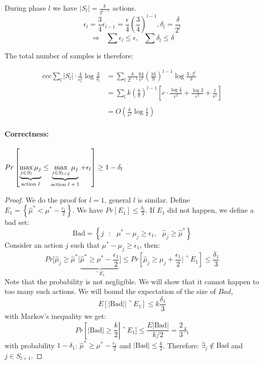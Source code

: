 During phase $l$ we have $\left|S_{l}\right|=\frac{k}{2^{l-1}}$
actions.
\[
\epsilon_{l}=\frac{3}{4}\epsilon_{l-1}=\frac{\epsilon}{4}\left(\frac{3}{4}\right)^{l-1},\text{
}\delta_{l}=\frac{\delta}{2^{l}}
\]
\[
\Rightarrow\text{ }{\displaystyle \sum\epsilon_{l}\le\epsilon},\text{ }{\displaystyle \sum\delta_{l}\le\delta}
\]

The total number of samples is therefore:

\begin{align*}{ccc}
 \sum_l |S_l| \cdot \frac{4}{\epsilon_l^2}\log \frac{3}{\delta_l} &=
\sum_{l}\frac{k}{2^{l-1}}\frac{64}{\epsilon^{2}}\left(\frac{16}{9}\right)^{l-1}\log\frac{3\cdot2^{l}}{\delta}\\
& =  {\displaystyle \sum_{l}k\left(\frac{8}{9}\right)^{l-1}\left[c\cdot\frac{\log\frac{1}{\delta}}{\epsilon^{2}}+\frac{\log3}{\epsilon^{2}}+\frac{l}{\epsilon^{2}}\right]}\\
\\
 & =  O\left(\frac{k}{\epsilon^{2}}\log\frac{1}{\delta}\right)
\end{align*}


\paragraph{Correctness:}

\begin{theorem}
$Pr\left[\underbrace{{\displaystyle \max_{j\in
S_{l}}\mu_{j}}}_{\text{action
\ensuremath{l}}}\le\underbrace{{\displaystyle \max_{j\in
S_{l+2}}\mu_{j}}}_{\text{action
\ensuremath{l+1}}}+\epsilon_{l}\right]\ge1-\delta_{l}$
\end{theorem}

\begin{proof}
We do the proof for $l=1$, general $l$ is similar. Define
$E_{1}=\left\{\hat{\mu}^{*}<\mu^{*}-\frac{\epsilon_{1}}{2}\right\}$.
We have  $Pr\left[E_{1}\right]\le\frac{\delta_{1}}{3}$. If $E_{1}$
did not happen, we define a bad set:
\[
\text{Bad}=\left\{ j\text{ }:\text{ }\mu^{*}-\mu_{j}\ge\epsilon_{1},\text{ }\hat{\mu}_{j}\ge\hat{\mu}^{*}\right\}
\]
Consider an action $j$ such that $\mu^*-\mu_j\geq \epsilon_1$, then:
\[
Pr[\hat{\mu}_{j}\geq
\hat{\mu}^{*}|\underbrace{\hat{\mu}^{*}\ge\mu^{*}-\frac{\epsilon_{1}}{2}}_{\urcorner
E_{1}}\big] \le
Pr[\hat{\mu}_{j}\ge\mu_{j}+\frac{\epsilon_{1}}{2}|\urcorner E_{1}]
\le  \frac{\delta_{1}}{3}
\]
Note that the probability is not negligible. We will show that it
cannot happen to too many such actions. We will bound the
expectation of the size of $Bad$,
\[
E[|\text{Bad}||\urcorner E_{1}]\le k\frac{\delta_{1}}{3}
\]
 with Markov's inequality we get:
\[
Pr\left[\left|\text{Bad}\right|\ge\frac{k}{2}\right|\urcorner E_{1}]
 \le  \frac{E\left|\text{Bad}\right|}{k/2}
  =  \frac{2}{3}\delta_{1}
\]
 with probability $1-\delta_{1}$: $\hat{\mu}^{*}\ge\mu^{*}-\frac{\epsilon_{1}}{2}$
and $\left|\text{Bad}\right|\le\frac{k}{2}$.
 Therefore: $\exists_{j}\notin\text{Bad}$ and $j\in S_{l+1}$.
\end{proof}
